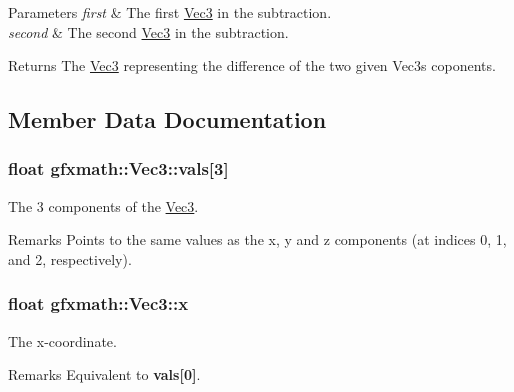 \begin{DoxyParams}{Parameters}
{\em first} & The first \hyperlink{classgfxmath_1_1_vec3}{Vec3} in the subtraction. \\
\hline
{\em second} & The second \hyperlink{classgfxmath_1_1_vec3}{Vec3} in the subtraction.\\
\hline
\end{DoxyParams}
\begin{DoxyReturn}{Returns}
The \hyperlink{classgfxmath_1_1_vec3}{Vec3} representing the difference of the two given Vec3s\textquotesingle{} coponents. 
\end{DoxyReturn}


\subsection{Member Data Documentation}
\hypertarget{classgfxmath_1_1_vec3_a9ce2feb7167c9fd1d521838da1daa7f9}{}
\subsubsection[{vals}]{\setlength{\rightskip}{0pt plus 5cm}float gfxmath\+::\+Vec3\+::vals\mbox{[}3\mbox{]}}\label{classgfxmath_1_1_vec3_a9ce2feb7167c9fd1d521838da1daa7f9}


The 3 components of the \hyperlink{classgfxmath_1_1_vec3}{Vec3}. 

\begin{DoxyRemark}{Remarks}
Points to the same values as the x, y and z components (at indices 0, 1, and 2, respectively). 
\end{DoxyRemark}
\hypertarget{classgfxmath_1_1_vec3_adb7cecf3b6d25eecf3924583f41d8c3a}{}
\subsubsection[{x}]{\setlength{\rightskip}{0pt plus 5cm}float gfxmath\+::\+Vec3\+::x}\label{classgfxmath_1_1_vec3_adb7cecf3b6d25eecf3924583f41d8c3a}


The x-\/coordinate. 

\begin{DoxyRemark}{Remarks}
Equivalent to {\bfseries vals\mbox{[}0\mbox{]}}. 
\end{DoxyRemark}
\hypertarget{classgfxmath_1_1_vec3_a398bee406395fdc1ad381f5b70d7fd99}{}
